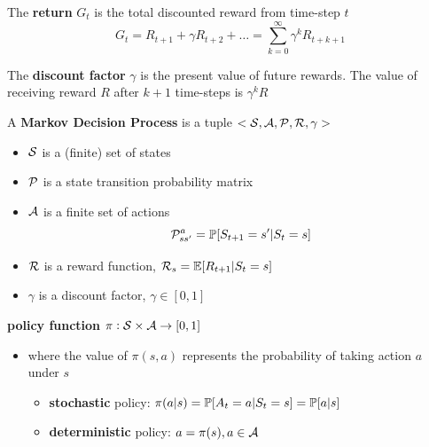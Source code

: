 \documentclass[11pt]{article}
\begin{document}
\begin{definition}
The \textbf{return} $G_t$ is the total discounted reward from time-step $t$
\begin{equation*}
G_t=R_{t+1}+\gamma R_{t+2}+\dots=\displaystyle\sum_{k=0}^\infty\gamma^kR_{t+k+1}
\end{equation*}
\end{definition}
The \textbf{discount factor} \(\gamma\) is the present value of future rewards. The
value of receiving reward \(R\) after \(k+1\) time-steps is \(\gamma^kR\)

\begin{definition}
A \textbf{Markov Decision Process} is a tuple $<\cals, \cala,\calp,\calr,\gamma>$
\begin{itemize}
\item $\cals$ is a (finite) set of states
\item $\calp$ is a state transition probability matrix
\item $\cala$ is a finite set of actions
\begin{equation*}
\calp_{ss'}^a=\P[S_{t+1}=s'|S_t=s]
\end{equation*}
\item $\calr$ is a reward function, $\calr_s=\E[R_{t+1}|S_t=s]$
\item $\gamma$ is a discount factor, $\gamma\in[0,1]$
\end{itemize}
\end{definition}

\textbf{policy function} \(\pi:\cals\times\cala\to[0,1]\) 
\begin{itemize}
\item where the value of \(\pi(s,a)\) represents the probability of taking action
\(a\) under \(s\) 
\begin{itemize}
\item \textbf{stochastic} policy: \(\pi(a|s)=\P[A_t=a|S_t=s]=\P[a|s]\)
\item \textbf{deterministic} policy: \(a=\pi(s), a\in\cala\)
\end{itemize}
\end{itemize}
\end{document}
